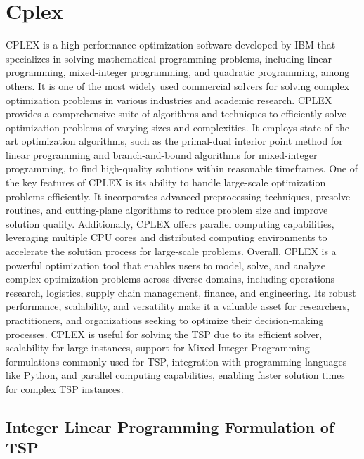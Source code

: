 \chapter{Cplex}

CPLEX is a high-performance optimization software developed by IBM that specializes in solving mathematical programming problems, including linear programming, mixed-integer programming, and quadratic programming, among others.
It is one of the most widely used commercial solvers for solving complex optimization problems in various industries and academic research.
CPLEX provides a comprehensive suite of algorithms and techniques to efficiently solve optimization problems of varying sizes and complexities.
It employs state-of-the-art optimization algorithms, such as the primal-dual interior point method for linear programming and branch-and-bound algorithms for mixed-integer programming, to find high-quality solutions within reasonable timeframes. 
One of the key features of CPLEX is its ability to handle large-scale optimization problems efficiently.
It incorporates advanced preprocessing techniques, presolve routines, and cutting-plane algorithms to reduce problem size and improve solution quality. 
Additionally, CPLEX offers parallel computing capabilities, leveraging multiple CPU cores and distributed computing environments to accelerate the solution process for large-scale problems.
Overall, CPLEX is a powerful optimization tool that enables users to model, solve, and analyze complex optimization problems across diverse domains, including operations research, logistics, supply chain management, finance, and engineering.
Its robust performance, scalability, and versatility make it a valuable asset for researchers, practitioners, and organizations seeking to optimize their decision-making processes.
CPLEX is useful for solving the TSP due to its efficient solver, scalability for large instances, support for Mixed-Integer Programming formulations commonly used for TSP, integration with programming languages like Python, and parallel computing capabilities, enabling faster solution times for complex TSP instances.



\section{Integer Linear Programming Formulation of TSP}


